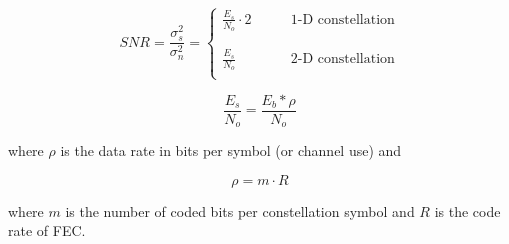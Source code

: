 \documentclass[12pt,a4paper]{article}
\begin{document}
\begin{equation}
    SNR=\frac{\sigma^2_s}{\sigma_n^2}=\begin{cases}
        \frac{E_s}{N_o}\cdot2 &\quad\quad \text{1-D constellation}\\
        \\
        \\
        \frac{E_s}{N_o} &\quad\quad \text{2-D constellation}\\
        \end{cases}\tag{4-1}
\end{equation}


\begin{equation}
    \frac{E_s}{N_o}=\frac{E_b*\rho}{N_o}
\tag{4-2}
\end{equation}

where $\rho$ is the data rate in bits per symbol (or channel use) and

\begin{equation}
    \rho=m\cdot R
\tag{4-3}
\end{equation}

where $m$ is the number of coded bits per constellation symbol and $R$ is the code rate of FEC.


% 
% 

\end{document}

